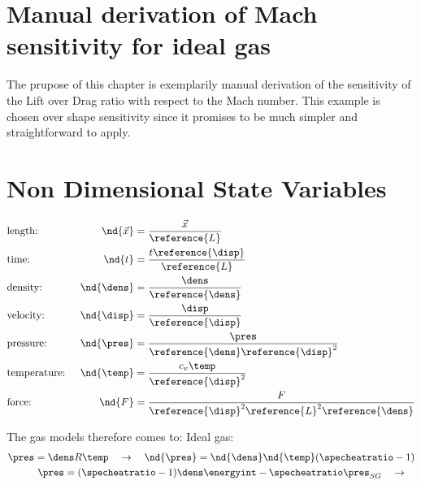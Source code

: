 \documentclass[../main.tex]{subfiles}
\begin{document}
\setlength{\delimitershortfall}{0pt}

\section{Manual derivation of Mach sensitivity for ideal gas}

The prupose of this chapter is exemplarily manual derivation of the sensitivity of the Lift over Drag ratio with respect to the Mach number. This example is chosen over shape sensitivity since it promises to be much simpler and straightforward to apply.



\def\nddens{\nd{\dens}}
\def\ndpres{\nd{\pres}}
\def\ndM{\nd{\M}}
\def\nddisp{\nd{\disp}}
\def\ndtemp{\nd{\temp}}
\def\ndtotpres{\nd{\totpres}}
\def\ndsspeed{\nd{\sspeed}}

\section{Non Dimensional State Variables}

\begin{align}
&\text{length: }&\nd{\vec{x}}&=\frac{\vec{x}}{ \reference{L} } \\
&\text{time: }&\nd{t}&=\frac{t \reference{\disp} }{ \reference{L} } \\
&\text{density: }&\nd{\dens}&=\frac{\dens}{ \reference{\dens} } \\
&\text{velocity: }&\nd{\disp}&=\frac{\disp}{ \reference{\disp} } \\
&\text{pressure: }&\nd{\pres}&=\frac{\pres}{ \reference{\dens}\reference{\disp}^2  } \\
&\text{temperature: }&\nd{\temp}&=\frac{c_v \temp}{ \reference{\disp}^2 } \\
&\text{force: }&\nd{F}&=\frac{F}{ \reference{\disp}^2 \reference{L}^2 \reference{\dens}  }
\end{align}

The gas models therefore comes to:
Ideal gas:
\begin{align}
\pres=\dens R \temp ~~~\rightarrow~~~   \nd{\pres}=\nd{\dens}\nd{\temp}(\specheatratio-1) \\
\pres=(\specheatratio-1)\dens\energyint-\specheatratio\pres_{SG} ~~~\rightarrow~~~
\end{align}
\end{document}
